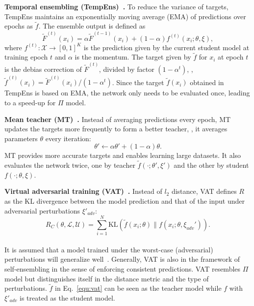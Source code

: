 \documentclass[10pt,twocolumn,letterpaper]{article}
\begin{document}
\textbf{Temporal ensembling (TempEns)~\cite{laine2016temporal}.} To reduce the variance of targets, TempEns maintains an exponentially moving average (EMA) of predictions over epochs as $\tilde{f}$. The ensemble output is defined as\\[-.3cm]
\begin{equation}\label{eq:f}
\tilde{F}^{(t)}(x_i) =  \alpha\tilde{F}^{(t-1)}(x_i) + (1-\alpha) f^{(t)}(x_i;\theta,\xi),
\end{equation} %
where $f^{(t)}:\mathcal{X} \to [0,1]^K$ is the prediction given by the current student model at training epoch $t$ and $\alpha$ is the momentum. The target given by $\tilde{f}$ for $x_i$ at epoch $t$ is the debias correction of $\tilde F^{(t)}$, divided by factor $(1-\alpha^t)$, \ie,
$\tilde{f}^{(t)} (x_i) = {\tilde F^{(t)}(x_i)}/{(1-\alpha^t)}$.
Since the target $\tilde{f}(x_i)$ obtained in TempEns is based on EMA, the network only needs to be evaluated once, leading to a speed-up for $\Pi$ model.

\textbf{Mean teacher (MT)~\cite{tarvainen2017mean}.}
Instead of averaging predictions every epoch, MT updates the targets more frequently to form a better teacher, \ie, it averages parameters $\theta$ every iteration:\\[-.5cm]
\begin{equation}
\theta' \leftarrow \alpha \theta' + (1-\alpha)\theta .
\end{equation}
MT provides more accurate targets and enables learning large datasets. It also evaluates the network twice, one by teacher $\tilde{f}(\cdot;\theta',\xi')$ and the other by student $f(\cdot;\theta,\xi)$.

\textbf{Virtual adversarial training (VAT)~\cite{miyato2017virtual}.}
Instead of $l_2$ distance, VAT defines $R$ as the KL divergence between the model prediction and that of the input under adversarial perturbations $\xi'_{adv}$:\\[-.3cm]
\begin{equation}
\label{equ:vat}
R_C(\theta, \mathcal{L},\mathcal{U}) = \sum_{i = 1}^{N} \mathrm{KL}(\tilde f(x_i;\theta)\|f (x_i ;\theta, \xi_{adv}')).
\end{equation}\\[-.4cm]
It is assumed that a model trained under the worst-case (adversarial) perturbations will generalize well~\cite{miyato2017virtual}.
Generally, VAT is also in the framework of self-ensembling in the sense of enforcing consistent predictions. VAT resembles $\Pi$ model but distinguishes itself in the distance metric and the type of perturbations. $\tilde f$ in Eq.~\eqref{equ:vat} can be seen as the teacher model while $f$ with $\xi'_{adv}$ is treated as the student model.
\end{document}
